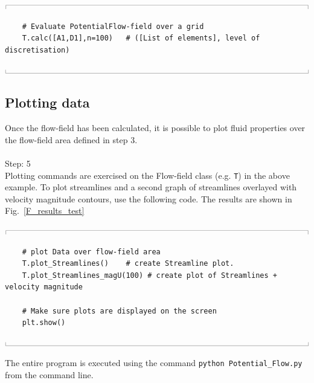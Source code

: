 \documentclass[10pt,a4paper]{article}
\newcommand{\topbar}{\ensuremath{
    \rule{0.1mm}{2.0mm} \rule[2.0mm]{159.5mm}{0.1mm} \rule{0.1mm}{2.0mm}
}}
\newcommand{\bottombar}{\ensuremath{
    \rule{0.1mm}{2.0mm} \rule{159.5mm}{0.1mm} \rule{0.1mm}{2.0mm}
}}
\begin{document}
\noindent
\topbar
\begin{lstlisting}
    # Evaluate PotentialFlow-field over a grid
    T.calc([A1,D1],n=100)   # ([List of elements], level of discretisation)
\end{lstlisting}
\bottombar


\subsection{Plotting data}

Once the flow-field has been calculated, it is possible to plot fluid properties over the flow-field area defined in step 3. 
\\ \\
\noindent
{\LARGE Step: 5}\\
Plotting commands are exercised on the Flow-field class (e.g. \verb'T') in the above example. 
To plot streamlines and a second graph of streamlines overlayed with velocity magnitude contours, use the following code. The results are shown in Fig.~\ref{F_results_test}

\noindent
\topbar
\begin{lstlisting}
    # plot Data over flow-field area
    T.plot_Streamlines()    # create Streamline plot.
    T.plot_Streamlines_magU(100) # create plot of Streamlines + velocity magnitude

    # Make sure plots are displayed on the screen
    plt.show()
\end{lstlisting}
\bottombar

\noindent
The entire program is executed using the command \verb'python Potential_Flow.py' from the command line. 
\end{document}
